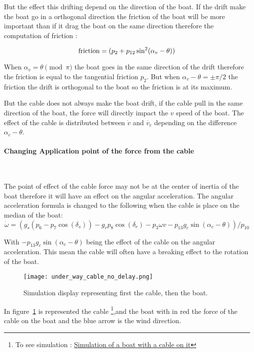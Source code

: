 But the effect this drifting depend on the direction of the boat.
If the drift make the boat go in a orthogonal direction the friction of the boat will be more important than if it
drag the boat on the same direction therefore the computation of friction :

\begin{equation}
\textnormal{friction} = (p_2+p_{12} \sin^2(\alpha_v-\theta))
\end{equation}

When $\alpha_v = \theta \pmod{\pi}$ the boat goes in the same direction of the drift therefore the friction is equal to the tangential friction $p_2$. But when $\alpha_v -\theta =\pm \pi/2$ the friction the drift is orthogonal to the boat so the friction is at its maximum.

But the cable does not always make the boat drift, if the cable pull in the same direction of the boat, the force 
will directly impact the $v$ speed of the boat. The effect of the cable is distributed between $\dot{v}$ and $\dot{v_c}$ depending on the difference $\alpha_c -\theta$.

\paragraph*{Changing Application point of the force from the cable}
~\\
\vskip1mm
\hskip7mm
 
The point of effect of the cable force may not be at the center of inertia of the boat therefore it will
have an effect on the angular acceleration. The angular acceleration formula is changed to the following  when
the cable is place on the median of the boat:
\begin{equation}
\dot{\omega} =
(g_s(p_6-p_7\cos(\delta_s))-g_r p_8 \cos(\delta_r)-p_3 \omega v -p_{13} g_c \sin(\alpha_c-\theta))/p_{10}
\end{equation}

With $-p_{13} g_c \sin(\alpha_c-\theta)$ being the effect of the cable on the angular acceleration.
This mean the cable will often have a breaking effect to the rotation of the boat.

\begin{figure}[H]
\centering
    \texttt{[image: under\_way\_cable\_no\_delay.png]}
    \caption{Simulation display representing first the cable, then the boat.}
    \label{fig:3wayBoat}
\end{figure}

In figure~\ref{fig:3wayBoat} is represented the cable \footnote{To see simulation : \href{https://www.youtube.com/watch?v=1nrbdikXr8A}{Simulation of a boat with a cable on it}},and the boat with in red the force of the cable on the boat and the blue arrow is the wind direction.

